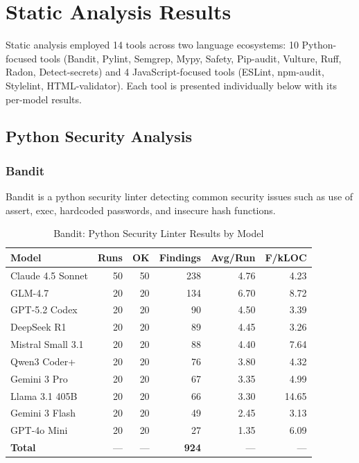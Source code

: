 \section{Static Analysis Results}
\label{sec:static_results}

Static analysis employed 14 tools across two language ecosystems: 10 Python-focused tools (Bandit, Pylint, Semgrep, Mypy, Safety, Pip-audit, Vulture, Ruff, Radon, Detect-secrets) and 4 JavaScript-focused tools (ESLint, npm-audit, Stylelint, HTML-validator). Each tool is presented individually below with its per-model results.

\subsection{Python Security Analysis}

\subsubsection{Bandit}

Bandit is a python security linter detecting common security issues such as use of assert, exec, hardcoded passwords, and insecure hash functions.

\begin{table}[htbp]
    \centering
    \caption{Bandit: Python Security Linter Results by Model}
    \label{tab:tool_bandit}
    \small
    \begin{tabular}{@{} l r r r r r @{}}
        \toprule
        \textbf{Model} & \textbf{Runs} & \textbf{OK} & \textbf{Findings} & \textbf{Avg/Run} & \textbf{F/kLOC} \\
        \midrule
        Claude 4.5 Sonnet & 50 & 50 & 238 & 4.76 & 4.23 \\
        GLM-4.7 & 20 & 20 & 134 & 6.70 & 8.72 \\
        GPT-5.2 Codex & 20 & 20 & 90 & 4.50 & 3.39 \\
        DeepSeek R1 & 20 & 20 & 89 & 4.45 & 3.26 \\
        Mistral Small 3.1 & 20 & 20 & 88 & 4.40 & 7.64 \\
        Qwen3 Coder+ & 20 & 20 & 76 & 3.80 & 4.32 \\
        Gemini 3 Pro & 20 & 20 & 67 & 3.35 & 4.99 \\
        Llama 3.1 405B & 20 & 20 & 66 & 3.30 & 14.65 \\
        Gemini 3 Flash & 20 & 20 & 49 & 2.45 & 3.13 \\
        GPT-4o Mini & 20 & 20 & 27 & 1.35 & 6.09 \\
        \midrule
        \textbf{Total} & --- & --- & \textbf{924} & --- & --- \\
        \bottomrule
    \end{tabular}
\end{table}

